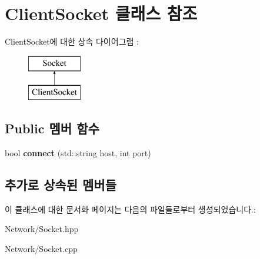 \hypertarget{class_client_socket}{}\section{Client\+Socket 클래스 참조}
\label{class_client_socket}
Client\+Socket에 대한 상속 다이어그램 \+: \begin{figure}[H]
\begin{center}
\leavevmode
\includegraphics[height=2.000000cm]{class_client_socket}
\end{center}
\end{figure}
\subsection*{Public 멤버 함수}
\begin{DoxyCompactItemize}
\item 
\mbox{\label{class_client_socket_a5d2c0258183d096645456311464d8f78}} 
bool {\bfseries connect} (std\+::string host, int port)
\end{DoxyCompactItemize}
\subsection*{추가로 상속된 멤버들}


이 클래스에 대한 문서화 페이지는 다음의 파일들로부터 생성되었습니다.\+:\begin{DoxyCompactItemize}
\item 
Network/Socket.\+hpp\item 
Network/Socket.\+cpp\end{DoxyCompactItemize}

